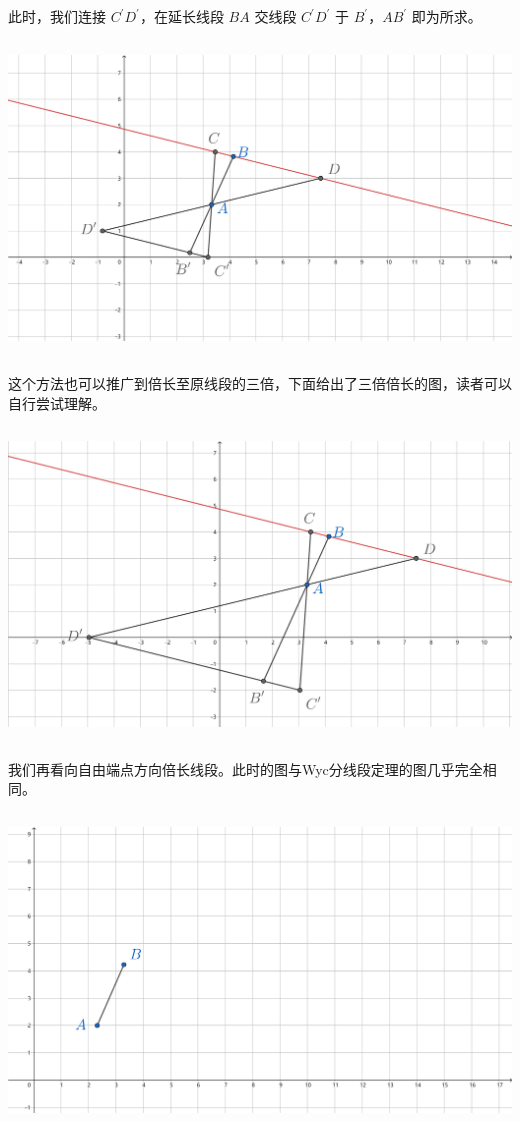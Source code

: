 \documentclass[UTF8]{article}
\begin{document}
此时，我们连接 \(C^{'}D^{'}\)，在延长线段 \(BA\) 交线段 \(C^{'}D^{'}\)
于 \(B^{'}\)，\(AB^{'}\) 即为所求。

\includegraphics[width=5.76806in,height=3.27847in]{media/image33.png}

这个方法也可以推广到倍长至原线段的三倍，下面给出了三倍倍长的图，读者可以自行尝试理解。

\includegraphics[width=5.76806in,height=3.27292in]{media/image34.png}

我们再看向自由端点方向倍长线段。此时的图与Wyc分线段定理的图几乎完全相同。

\includegraphics[width=5.76806in,height=3.27847in]{media/image35.png}
\end{document}
